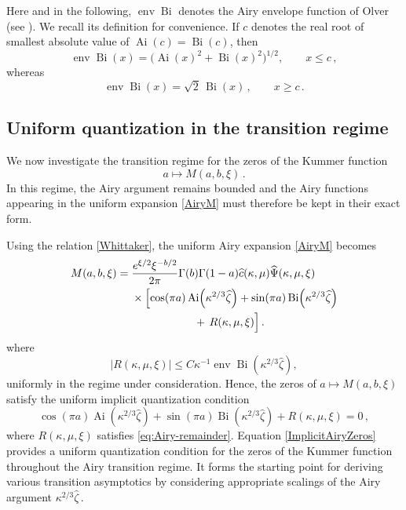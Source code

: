 \documentclass[11pt]{amsart}
\numberwithin{equation}{section}
\theoremstyle{remark}
\newcommand{\mn}{\medskip\noindent}
\newcommand{\Ai}{\operatorname{Ai}}
\newcommand{\Bi}{\operatorname{Bi}}
\begin{document}
Here and in the following, $\operatorname{env}\Bi$ denotes the Airy
envelope function of Olver (see \cite[\S2.8(iii)]{DLMF}). We recall its definition for convenience. If $c$ denotes the real root of smallest absolute value of
$\Ai(c)=\Bi(c)$, then
\[\operatorname{env}\Bi(x)
=
\bigl(\Ai(x)^2+\Bi(x)^2\bigr)^{1/2},
\qquad x\leq c\,,
\]
%
whereas
%
\[\operatorname{env}\Bi(x)
=
\sqrt{2}\,\Bi(x)\,,
\qquad x\geq c\,.
\]
%

\subsection{Uniform quantization in the transition regime}

We now investigate the transition regime for the zeros of the Kummer
function
\[
a\longmapsto M(a,b,\xi)\,.
\]
In this regime, the Airy argument remains bounded and the Airy
functions appearing in the uniform expansion \eqref{AiryM} must
therefore be kept in their exact form. 

\mn

Using the relation \eqref{Whittaker}, the uniform Airy expansion
\eqref{AiryM} becomes
%
\[\begin{aligned}
M(a,b,\xi)
={}&
\frac{e^{\xi/2}\xi^{-b/2}}{2\pi}
\Gamma(b)
\Gamma(1-a)
\widehat c(\kappa,\mu)
\widehat\Psi(\kappa,\mu,\xi)
\\
&\times
\Bigl[
\cos(\pi a)
\operatorname{Ai}\!\left(\kappa^{2/3}\widehat\zeta\right)
+
\sin(\pi a)
\operatorname{Bi}\!\left(\kappa^{2/3}\widehat\zeta\right)
\\
&\hspace{2cm}
+\,
R(\kappa,\mu,\xi)
\Bigr]\,.
\end{aligned}
\]
%
where
\begin{equation}\label{eq:Airy-remainder}
\bigl|R(\kappa,\mu,\xi)\bigr|
\leq
C\kappa^{-1}
\operatorname{env}\Bi
\!\left(\kappa^{2/3}\widehat\zeta\right),
\end{equation}
uniformly in the regime under consideration. Hence, the zeros of $a\mapsto M(a,b,\xi)$ satisfy the uniform
implicit quantization condition
\begin{equation}\label{ImplicitAiryZeros}
\cos(\pi a)
\operatorname{Ai}\!\left(\kappa^{2/3}\widehat\zeta\right)
+
\sin(\pi a)
\operatorname{Bi}\!\left(\kappa^{2/3}\widehat\zeta\right)
+
R(\kappa,\mu,\xi)
=
0\,,
\end{equation}
where $R(\kappa,\mu,\xi)$ satisfies
\eqref{eq:Airy-remainder}. 
Equation \eqref{ImplicitAiryZeros} provides a uniform quantization
condition for the zeros of the Kummer function throughout the Airy
transition regime. It forms the starting point for deriving various
transition asymptotics by considering appropriate scalings of the Airy
argument
$
\kappa^{2/3}\widehat\zeta\,.
$
\end{document}

